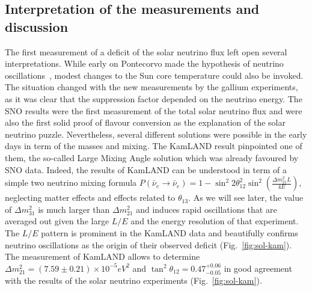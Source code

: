 \subsection{Interpretation of the measurements and discussion}
\label{subsec:solarinter}

The first measurement of a deficit of the solar neutrino flux left open several interpretations. While early on Pontecorvo made the hypothesis of neutrino oscillations~\cite{pontecorvo67}, modest changes to the Sun core temperature could also be invoked. 
The situation changed with the new measurements by the gallium experiments, as it was clear that the suppression factor depended on the neutrino energy. The SNO results were the first measurement of the total solar neutrino flux and were also the first solid proof of flavour conversion as the explanation of the solar neutrino puzzle. 
Nevertheless, several different solutions were possible in the early days in term of the masses and mixing. The KamLAND result pinpointed one of them, the so-called Large Mixing Angle solution which was already favoured by SNO data. Indeed, the results of KamLAND can be understood in term of a simple two neutrino mixing formula $ P(\bar{\nu}_e \rightarrow \bar{\nu}_e ) = 1 - \sin^2 2 \theta_{12}^2 \sin^2 (\frac{\Delta m^2_{21} L}{4 E}) $, neglecting matter effects and effects related to $\theta_{13}$. As we will see later, the value of $\Delta m^2_{31}$ is much larger than $\Delta m^2_{21}$ and induces rapid oscillations that are averaged out given the large $L/E$ and the energy resolution of that experiment. The $L/E$ pattern is prominent in the KamLAND data and beautifully confirms neutrino oscillations as the origin of their observed deficit (Fig.~\ref{fig:sol-kam}). The measurement of KamLAND allows to determine $\Delta m^2_{21} = (7.59 \pm 0.21) \times 10^{-5}
eV^2$ and $\tan^2 \theta_{12} = 0.47 ^{+0.06} _{-0.05} $ in good agreement with the results of the solar neutrino experiments (Fig.~\ref{fig:sol-kam}).


